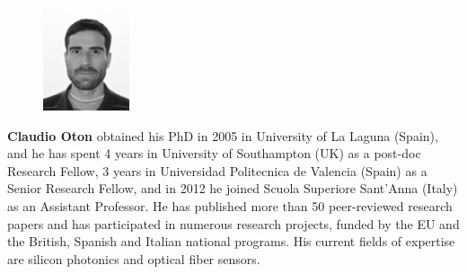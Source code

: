 \documentclass[journal]{IEEEtran}
\begin{document}
\begin{figure}
\includegraphics[width=1in]{claudio}
\end{figure}
\textbf{Claudio Oton} obtained his PhD in 2005 in University of La Laguna (Spain), and he has spent 4 years in University of Southampton (UK) as a post-doc Research Fellow, 3 years in Universidad Politecnica de Valencia (Spain) as a Senior Research Fellow, and in 2012 he joined Scuola Superiore Sant'Anna (Italy) as an Assistant Professor. He has published more than 50 peer-reviewed research papers and has participated in numerous research projects, funded by the EU and the British, Spanish and Italian national programs. His current fields of expertise are silicon photonics and optical fiber sensors.
\end{document}
